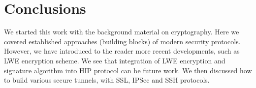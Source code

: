 \chapter{Conclusions}

We started this work with the background material on cryptography. Here we covered
established approaches (building blocks) of modern security protocols. However, we 
have introduced to the reader more recent developments, such as LWE encryption scheme.
We see that integration of LWE encryption and signature algorithm into HIP protocol 
can be future work. We then discussed how to build various secure tunnels, \eg with 
SSL, IPSec and SSH protocols. 


